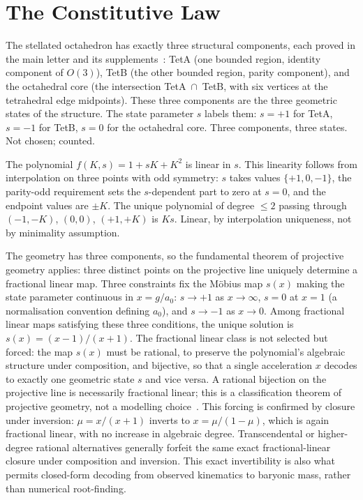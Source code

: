 \documentclass[twocolumn]{iopjournal}
\begin{document}
\section*{The Constitutive Law}

The stellated octahedron has exactly three structural components,
each proved in the main letter and its
supplements~\cite{Nelson2026geometry,Nelson2026scheme}: TetA (one
bounded region, identity component of $O(3)$), TetB (the other
bounded region, parity component), and the octahedral core (the
intersection TetA~$\cap$~TetB, with six vertices at the
tetrahedral edge midpoints). These three components are the three
geometric states of the structure. The state parameter $s$ labels
them: $s = +1$ for TetA, $s = -1$ for TetB, $s = 0$ for the
octahedral core. Three components, three states. Not chosen;
counted.

The polynomial $f(K,s) = 1 + sK + K^2$ is linear in $s$.
This linearity follows from interpolation on three points with
odd symmetry: $s$ takes values $\{+1, 0, -1\}$, the parity-odd
requirement sets the $s$-dependent part to zero at $s = 0$, and
the endpoint values are $\pm K$. The unique polynomial of degree
$\leq 2$ passing through $(-1, -K)$, $(0, 0)$, $(+1, +K)$ is
$Ks$. Linear, by interpolation uniqueness, not by minimality
assumption.

The geometry has three components, so the fundamental theorem of
projective geometry applies: three distinct points on the
projective line uniquely determine a fractional linear map. Three
constraints fix the M\"{o}bius map $s(x)$
making the state parameter continuous in $x = g/a_0$: $s \to
+1$ as $x \to \infty$, $s = 0$ at $x = 1$ (a normalisation
convention defining $a_0$), and $s \to -1$ as $x \to 0$. Among
fractional linear maps satisfying these three conditions, the
unique solution is $s(x) = (x-1)/(x+1)$. The fractional linear
class is not selected but forced: the map $s(x)$ must be rational,
to preserve the polynomial's algebraic structure under composition,
and bijective, so that a single acceleration $x$ decodes to exactly
one geometric state $s$ and vice versa. A rational bijection on the
projective line is necessarily fractional linear; this is a
classification theorem of projective geometry, not a modelling
choice~\cite{Hartshorne1977}.
This forcing is confirmed by closure under inversion:
$\mu = x/(x+1)$ inverts to $x = \mu/(1-\mu)$, which is again
fractional linear, with no increase in algebraic degree. Transcendental or higher-degree rational
alternatives generally forfeit the same exact fractional-linear
closure under composition and inversion. This exact invertibility
is also what permits closed-form decoding from observed kinematics
to baryonic mass, rather than numerical root-finding.
\end{document}
